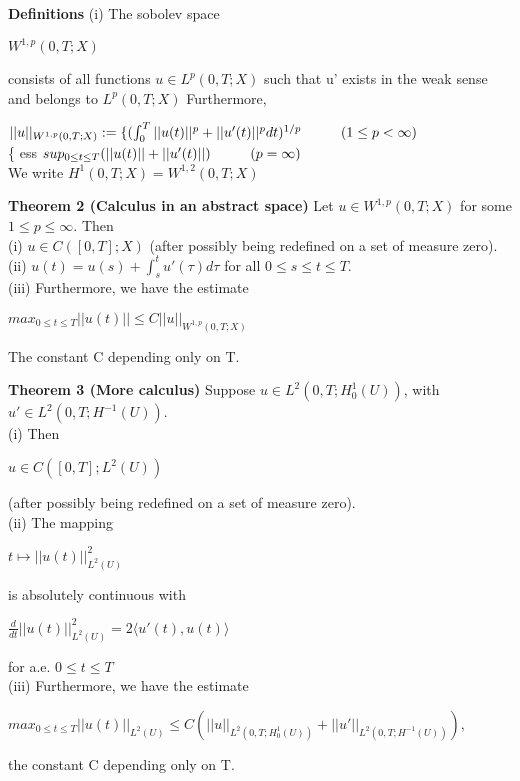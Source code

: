 \documentclass{article}
\newcommand\tab[1][1cm]{\hspace*{#1}}
\begin{document}
\textbf {Definitions} (i) The sobolev space
 \begin{center}
$W^{1,p} (0, T; X)$
\end{center}
consists of all functions $u \in L^p (0, T; X)$ such that u' exists in the weak sense and belongs to $L^p (0, T; X)$ Furthermore,
 \begin{center}
$||u||_{W^{1,p}(0, T; X)} := \{ ( \int_0^T ||u(t)||^p + ||u'(t)||^p dt )^{1/p} \tab ( 1 \leq p < \infty)$ \\
\tab \tab \{ ess $sup_{0 \leq t \leq T}(||u(t)|| + ||u'(t)||) \tab (p = \infty)$ \\
We write $H^1(0, T; X) = W^{1,2} (0, T; X)$
\end{center}

\textbf {Theorem 2 (Calculus in an abstract space)} Let $u \in W^{1,p} (0, T; X)$ for some $1 \leq p \leq \infty$. Then \\
\tab (i) $u \in C([0,T]; X)$ (after possibly being redefined on a set of measure zero). \\
\tab (ii) $u(t) = u(s) + \int_s^t u'(\tau) d\tau$ \tab for all $0 \leq s \leq t \leq T$. \\
\tab (iii) Furthermore, we have the estimate
 \begin{center}
$max_{0 \leq t \leq T} ||u(t)|| \leq C||u||_{W^{1,p}(0, T; X)}$
\end{center}
The constant C depending only on T.

\textbf {Theorem 3 (More calculus)} Suppose $u \in L^2 (0, T; H_0^1(U))$, with $u' \in L^2(0, T; H^{-1}(U))$. \\
\tab (i) Then
 \begin{center}
$u \in C([0, T]; L^2(U))$
\end{center}
(after possibly being redefined on a set of measure zero). \\
\tab (ii) The mapping 
 \begin{center}
$t \mapsto ||u(t)||^{2}_{L^{2}(U)}$
\end{center}
is absolutely continuous with 
 \begin{center}
$\frac{d}{dt}||u(t)||^2_{L^{2}(U)} = 2 \langle u'(t), u(t) \rangle$
\end{center}
for a.e. $0 \leq t \leq T$ \\
\tab (iii) Furthermore, we have the estimate
 \begin{center}
$max_{0 \leq t \leq T} ||u(t)||_{L^{2}(U)} \leq C (||u||_{L^{2}(0, T; H_{0}^{1}(U))} + ||u'||_{L^{2}(0, T; H^{-1}(U))})$,
\end{center}
the constant C depending only on T.
\end{document}
